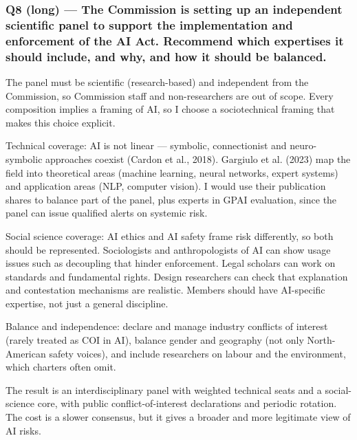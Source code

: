 \documentclass[11pt,a4paper]{article}
\newcommand{\blk}[1]{{\setlength{\fboxsep}{2pt}\colorbox{ink}{\sffamily\footnotesize\bfseries\color{white}\,#1\,}}}
\begin{document}
\subsubsection*{Q8 (long) — The Commission is setting up an independent scientific panel to support the implementation and enforcement of the AI Act. Recommend which expertises it should include, and why, and how it should be balanced.}
\begin{description}[leftmargin=1.2cm,style=sameline]
\item[\blk{F}] The panel must be scientific (research-based) and independent from the Commission, so Commission staff and non-researchers are out of scope. Every composition implies a framing of AI, so I choose a sociotechnical framing that makes this choice explicit.
\item[\blk{A1}] Technical coverage: AI is not linear — symbolic, connectionist and neuro-symbolic approaches coexist (Cardon et al., 2018). Gargiulo et al. (2023) map the field into theoretical areas (machine learning, neural networks, expert systems) and application areas (NLP, computer vision). I would use their publication shares to balance part of the panel, plus experts in GPAI evaluation, since the panel can issue qualified alerts on systemic risk.
\item[\blk{A2}] Social science coverage: AI ethics and AI safety frame risk differently, so both should be represented. Sociologists and anthropologists of AI can show usage issues such as decoupling that hinder enforcement. Legal scholars can work on standards and fundamental rights. Design researchers can check that explanation and contestation mechanisms are realistic. Members should have AI-specific expertise, not just a general discipline.
\item[\blk{A3}] Balance and independence: declare and manage industry conflicts of interest (rarely treated as COI in AI), balance gender and geography (not only North-American safety voices), and include researchers on labour and the environment, which charters often omit.
\item[\blk{R}] The result is an interdisciplinary panel with weighted technical seats and a social-science core, with public conflict-of-interest declarations and periodic rotation. The cost is a slower consensus, but it gives a broader and more legitimate view of AI risks.
\end{description}
\end{document}

